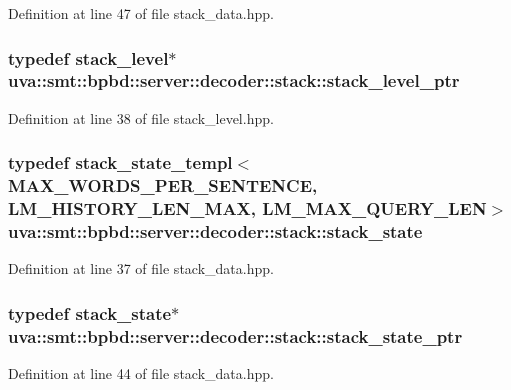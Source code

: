 Definition at line 47 of file stack\+\_\+data.\+hpp.

\hypertarget{namespaceuva_1_1smt_1_1bpbd_1_1server_1_1decoder_1_1stack_a31cf19f71615dd8153681ac71e72859d}{}
\subsubsection[{stack\+\_\+level\+\_\+ptr}]{\setlength{\rightskip}{0pt plus 5cm}typedef {\bf stack\+\_\+level}$\ast$ {\bf uva\+::smt\+::bpbd\+::server\+::decoder\+::stack\+::stack\+\_\+level\+\_\+ptr}}\label{namespaceuva_1_1smt_1_1bpbd_1_1server_1_1decoder_1_1stack_a31cf19f71615dd8153681ac71e72859d}


Definition at line 38 of file stack\+\_\+level.\+hpp.

\hypertarget{namespaceuva_1_1smt_1_1bpbd_1_1server_1_1decoder_1_1stack_a30416dfcace69691af43f9f44a076f7e}{}
\subsubsection[{stack\+\_\+state}]{\setlength{\rightskip}{0pt plus 5cm}typedef {\bf stack\+\_\+state\+\_\+templ}$<$M\+A\+X\+\_\+\+W\+O\+R\+D\+S\+\_\+\+P\+E\+R\+\_\+\+S\+E\+N\+T\+E\+N\+C\+E, L\+M\+\_\+\+H\+I\+S\+T\+O\+R\+Y\+\_\+\+L\+E\+N\+\_\+\+M\+A\+X, L\+M\+\_\+\+M\+A\+X\+\_\+\+Q\+U\+E\+R\+Y\+\_\+\+L\+E\+N$>$ {\bf uva\+::smt\+::bpbd\+::server\+::decoder\+::stack\+::stack\+\_\+state}}\label{namespaceuva_1_1smt_1_1bpbd_1_1server_1_1decoder_1_1stack_a30416dfcace69691af43f9f44a076f7e}


Definition at line 37 of file stack\+\_\+data.\+hpp.

\hypertarget{namespaceuva_1_1smt_1_1bpbd_1_1server_1_1decoder_1_1stack_ab08047a5fae45b1c4311bd5d5aa2c4fc}{}
\subsubsection[{stack\+\_\+state\+\_\+ptr}]{\setlength{\rightskip}{0pt plus 5cm}typedef {\bf stack\+\_\+state}$\ast$ {\bf uva\+::smt\+::bpbd\+::server\+::decoder\+::stack\+::stack\+\_\+state\+\_\+ptr}}\label{namespaceuva_1_1smt_1_1bpbd_1_1server_1_1decoder_1_1stack_ab08047a5fae45b1c4311bd5d5aa2c4fc}


Definition at line 44 of file stack\+\_\+data.\+hpp.

